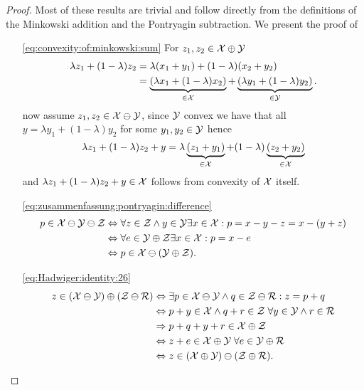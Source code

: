 \begin{proof}
%
Most of these results are trivial and follow directly from the definitions of the Minkowski addition and the Pontryagin subtraction.
%
We present the proof of
%
\begin{itemize}
\item[\eqref{eq:convexity:of:minkowski:sum}]
For $z_1,z_2\in\mathcal X\oplus\mathcal Y$
%
\begin{equation}\begin{aligned}
	\lambda z_1+(1-\lambda)z_2 &= \lambda(x_1+y_1) + (1-\lambda)(x_2+y_2)\\
	 &= \underbrace{(\lambda x_1+(1-\lambda)x_2)}_{\in\mathcal X} + \underbrace{(\lambda y_1+(1-\lambda)y_2)}_{\in\mathcal Y}.
	 \end{aligned}
\end{equation}
%
now assume $z_1,z_2\in\mathcal X\ominus\mathcal Y$, since $\mathcal Y$ convex we have that all $y=\lambda y_1+(1-\lambda)y_2$ for some $y_1,y_2\in\mathcal Y$ hence
%
\begin{equation}
	\lambda z_1 + (1-\lambda)z_2 + y = \lambda\underbrace{(z_1+y_1)}_{\in\mathcal X} + (1-\lambda)\underbrace{(z_2+y_2)}_{\in\mathcal X}
\end{equation}
%
and $\lambda z_1 + (1-\lambda)z_2 + y\in\mathcal X$ follows from convexity of $\mathcal X$ itself.
%
\item[\eqref{eq:zusammenfassung:pontryagin:difference}]
%
\begin{equation}\begin{aligned}
	p\in\mathcal X\ominus\mathcal Y\ominus\mathcal Z &\Leftrightarrow \forall z\in\mathcal Z\wedge y\in\mathcal Y\exists x\in\mathcal X: p = x-y-z = x-(y+z)\\
	&\Leftrightarrow \forall e\in\mathcal Y\oplus\mathcal Z\exists x\in\mathcal X: p = x-e\\
	&\Leftrightarrow p\in\mathcal X\ominus(\mathcal Y\oplus\mathcal Z).
\end{aligned}\end{equation}
\item[\eqref{eq:Hadwiger:identity:26}]
%
\begin{equation}
\begin{aligned}	
z\in(\X\ominus\Y)\oplus(\Z\ominus\mathcal R)&\Leftrightarrow \exists p\in\X\ominus\Y\wedge q\in\Z\ominus\R: z=p+q\\
&\Leftrightarrow p+y\in\X\wedge q+r\in\Z\; \forall y\in\Y\wedge r\in\R\\
&\Rightarrow p+q+y+r\in\X\oplus\Z\\
&\Leftrightarrow z + e \in\X\oplus\Y\; \forall e\in\Y\oplus\R\\
&\Leftrightarrow z\in (\X\oplus\Y)\ominus(\Z\oplus\R).

\end{aligned}
\end{equation}
\end{itemize}
\end{proof}
